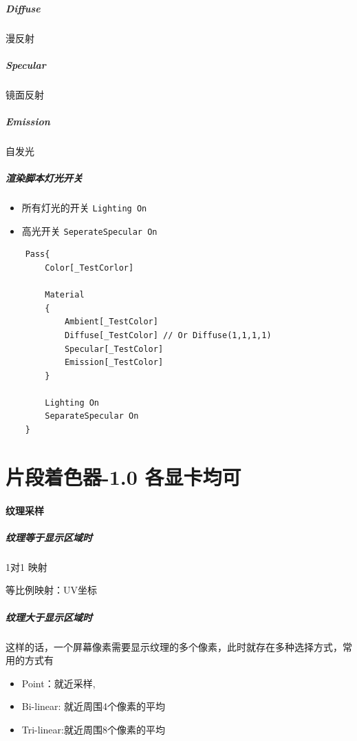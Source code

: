 \documentclass[UTF8,a4paper,12pt]{ctexbook}
\begin{document}
			\subparagraph{Diffuse} 漫反射
			
			\subparagraph{Specular} 镜面反射
			
			\subparagraph{Emission} 自发光
	
			\subparagraph{渲染脚本灯光开关}
				\begin{itemize}
					\item 所有灯光的开关 \verb|Lighting On|
					\item 高光开关 \verb|SeperateSpecular On|
				\end{itemize}
			
			\begin{lstlisting}
	Pass{
		Color[_TestCorlor]
		
		Material
		{
			Ambient[_TestColor]
			Diffuse[_TestColor] // Or Diffuse(1,1,1,1) 
			Specular[_TestColor]
			Emission[_TestColor]
		}
		
		Lighting On 
		SeparateSpecular On
	}
			\end{lstlisting}
	\section{片段着色器-1.0 各显卡均可}
		\paragraph{纹理采样}
			\subparagraph{纹理等于显示区域时}
				1对1 映射
				
				等比例映射：UV坐标
									
			\subparagraph{纹理大于显示区域时}
				这样的话，一个屏幕像素需要显示纹理的多个像素，此时就存在多种选择方式，常用的方式有
				\begin{itemize}
					\item Point：就近采样,
					\item Bi-linear: 就近周围4个像素的平均
					\item Tri-linear:就近周围8个像素的平均
				\end{itemize}
			
\end{document}
